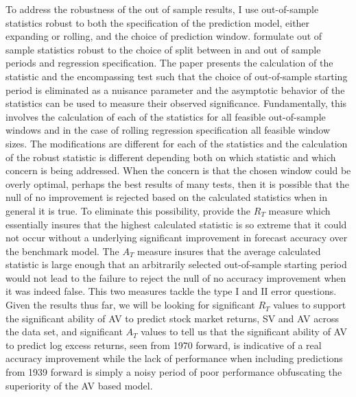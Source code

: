 To address the robustness of the out of sample results, I use out-of-sample statistics robust to both the specification of the prediction model, either expanding or rolling, and the choice of prediction window. \cite{rossi_out--sample_2012} formulate out of sample statistics robust to the choice of split between in and out of sample periods and regression specification. The paper presents the calculation of the \citet{Diebold1995} statistic and the \citet{harvey_tests_1998} encompassing test such that the choice of out-of-sample starting period is eliminated as a nuisance parameter and the asymptotic behavior of the statistics can be used to measure their observed significance. Fundamentally, this involves the calculation of each of the statistics for all feasible out-of-sample windows and in the case of rolling regression specification all feasible window sizes. The modifications are different for each of the statistics and the calculation of the robust statistic is different depending both on which statistic and which concern is being addressed. When the concern is that the chosen window could be overly optimal, perhaps the best results of many tests, then it is possible that the null of no improvement is rejected based on the calculated statistics when in general it is true. To eliminate this possibility, \citet{rossi_out--sample_2012} provide the $R_{T}$ measure which essentially insures that the highest calculated statistic is so extreme that it could not occur without a underlying significant improvement in forecast accuracy over the benchmark model. The $A_{T}$ measure insures that the average calculated statistic is large enough that an arbitrarily selected out-of-sample starting period would not lead to the failure to reject the null of no accuracy improvement when it was indeed false. This two measures tackle the type I and II error questions. Given the results thus far, we will be looking for significant $R_{T}$ values to support the significant ability of AV to predict stock market returns, SV and AV across the data set, and significant $A_{T}$ values to tell us that the significant ability of AV to predict log excess returns, seen from 1970 forward, is indicative of a real accuracy improvement while the lack of performance when including predictions from 1939 forward is simply a noisy period of poor performance obfuscating the superiority of the AV based model.

